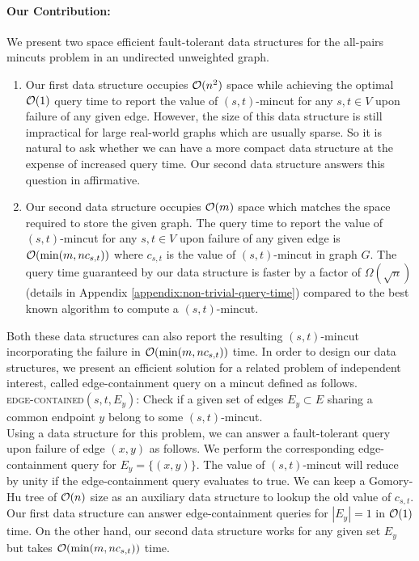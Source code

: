 \paragraph{Our Contribution:} We present two space efficient fault-tolerant data structures for the all-pairs mincuts problem in an undirected unweighted graph.

\begin{enumerate}
    \item 
Our first data structure occupies ${\cal O}(n^2)$ space while achieving the optimal ${\cal O}(1)$ query time to report the value of $(s,t)$-mincut for any $s,t\in V$ upon failure of any given edge. However, the size of this data structure is still impractical for large real-world graphs which are usually sparse. So it is natural to ask whether we can have a more compact data structure at the expense of increased query time. Our second data structure answers this question in affirmative.

    \item
Our second data structure occupies ${\cal O}(m)$ space which matches the space required to store the given graph.
The query time to report the value of $(s,t)$-mincut for any $s,t\in V$ upon failure of any given edge is ${\cal O}(\min(m,nc_{s,t}))$ where $c_{s,t}$ is the value of $(s,t)$-mincut in graph $G$. The query time guaranteed by our data structure is faster by a factor of $\Omega(\sqrt{n})$ (details in Appendix \ref{appendix:non-trivial-query-time}) compared to the best known algorithm \cite{DBLP:conf/focs/GoldbergR97a,DBLP:conf/stoc/KargerL98} to compute a $(s,t)$-mincut.

\end{enumerate}
Both these data structures can also report the resulting $(s,t)$-mincut incorporating the failure in ${\cal O}(\min(m,n c_{s,t}))$ time.
In order to design our data structures, we present an efficient solution for a related problem of independent interest, called edge-containment query on a mincut defined as follows.\\

\noindent
{\textsc{edge-contained}}$(s,t,E_y)$: Check if a given set of edges $E_y\subset E$ sharing a common endpoint $y$ belong to some $(s,t)$-mincut.\\

Using a data structure for this problem, we can answer a fault-tolerant query upon failure of edge $(x,y)$ as follows. We perform the corresponding edge-containment query for $E_y = \{(x,y)\}$. The value of $(s,t)$-mincut will reduce by unity if the edge-containment query evaluates to true. We can keep a Gomory-Hu tree of ${\cal O}(n)$ size as an auxiliary data structure to lookup the old value of $c_{s,t}$. Our first data structure can answer edge-containment queries for $|E_y|=1$ in  ${\cal O}(1)$ time. On the other hand, our second data structure works for any given set $E_y$ but takes ${\cal O}(\min(m,nc_{s,t}))$ time. 


